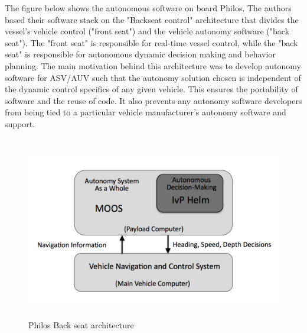 The figure below shows the autonomous software on board Philos. The authors based their software stack on the "Backseat control" architecture that divides the vessel's vehicle control ("front seat") and the vehicle autonomy software ("back seat"). The "front seat" is responsible for real-time vessel control, while the "back seat" is responsible for autonomous dynamic decision making and behavior planning. The main motivation behind this architecture was to develop autonomy software for ASV/AUV such that the autonomy solution chosen is independent of the dynamic control specifics of any given vehicle. This ensures the portability of software and the reuse of code. It also prevents any autonomy software developers from being tied to a particular vehicle manufacturer's autonomy software and support\cite{eickstedt2010backseat}. 
\begin{figure}[H]
    \centering
    \includegraphics[width=\textwidth,height=8cm,keepaspectratio=true]{src/Images/backseat_arch.PNG}
    \caption{
     Philos Back seat architecture \cite{defilippo2021robowhaler}
     }
\end{figure}
\\

